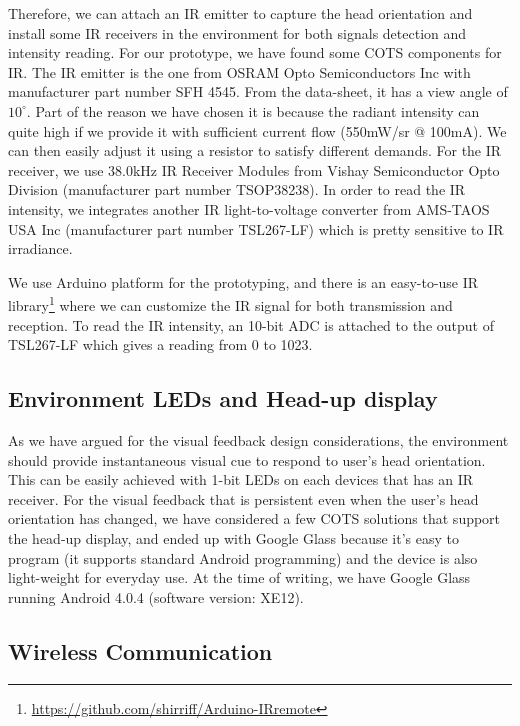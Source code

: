 Therefore, we can attach an IR emitter to capture the head orientation and install some IR receivers in the environment for both signals detection and intensity reading. For our prototype, we have found some COTS components for IR. 
The IR emitter is the one from OSRAM Opto Semiconductors Inc with manufacturer part number SFH 4545. From the data-sheet, it has a view angle of $10^\circ$. Part of the reason we have chosen it is because the radiant intensity can quite high if we provide it with sufficient current flow (550mW/sr @ 100mA). We can then easily adjust it using a resistor to satisfy different demands. 
For the IR receiver, we use 38.0kHz IR Receiver Modules from Vishay Semiconductor Opto Division (manufacturer part number TSOP38238). 
In order to read the IR intensity, we integrates another IR light-to-voltage converter from AMS-TAOS USA Inc (manufacturer part number TSL267-LF) which is pretty sensitive to IR irradiance. 

We use Arduino platform for the prototyping, and there is an easy-to-use IR library\footnote{\url{https://github.com/shirriff/Arduino-IRremote}} where we can customize the IR signal for both transmission and reception. To read the IR intensity, an 10-bit ADC is attached to the output of TSL267-LF which gives a reading from 0 to 1023. 

\subsection{Environment LEDs and Head-up display}
\label{sec:head-up-display}
As we have argued for the visual feedback design considerations, the environment should provide instantaneous visual cue to respond to user's head orientation. This can be easily achieved with 1-bit LEDs on each devices that has an IR receiver. For the visual feedback that is persistent even when the user's head orientation has changed, we have considered a few COTS solutions that support the head-up display, and ended up with Google Glass because it's easy to program (it supports standard Android programming) and the device is also light-weight for everyday use. At the time of writing, we have Google Glass running Android 4.0.4 (software version: XE12). 

\subsection{Wireless Communication}
\label{sec:wirel-comm}

